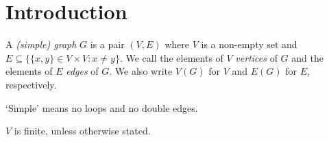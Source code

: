 \section{Introduction}

\begin{definition}\label{1.1}
    A \emph{(simple) graph} $G$ is a pair $(V, E)$ where $V$ is a non-empty
    set and $E \subseteq \{\{x,y\} \in V \times V: x \neq y\}$. We call the elements of
    $V$ \emph{vertices} of $G$ and the elements of $E$
    \emph{edges} of $G$. We also write $V(G)$ for $V$ and $E(G)$ for $E$,
    respectively.

    \lq Simple\rq{} means no loops and no double edges.
\end{definition}

\bigskip

\begin{remark}\label{1.2}
    $V$ is finite, unless otherwise stated.
\end{remark}

\bigskip

